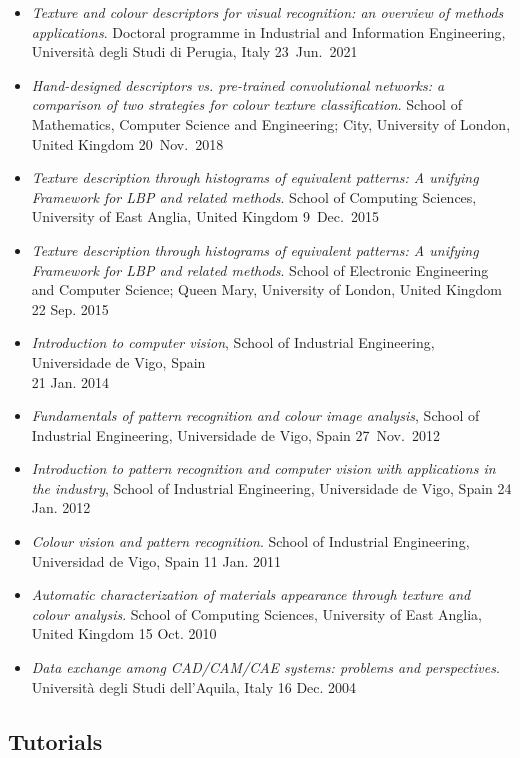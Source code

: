 \documentclass[11pt]{article}
\begin{document}
\begin{itemize}
	\item \emph{Texture and colour descriptors for visual recognition: an overview of methods applications}. Doctoral programme in Industrial and Information Engineering, Università degli Studi di Perugia, Italy \mbox{} \hfill 23~Jun.~2021
	\item \emph{Hand-designed descriptors vs. pre-trained convolutional networks: a comparison of two strategies for colour texture classification}. School of Mathematics, Computer Science and Engineering; City, University of London, United Kingdom \hfill 20~Nov.~2018
	\item \emph{Texture description through histograms of equivalent patterns: A unifying Framework for LBP and related methods}. School of Computing Sciences, University of East Anglia, United Kingdom \mbox{} \hfill 9~Dec.~2015
	\item \emph{Texture description through histograms of equivalent patterns: A unifying Framework for LBP and related methods}. School of Electronic Engineering and Computer Science; Queen Mary, University of London, United Kingdom \hfill 22 Sep. 2015
	\item \emph{Introduction to computer vision}, School of Industrial Engineering, Universidade de Vigo, Spain \\ \mbox{} \hfill 21 Jan. 2014
	\item \emph{Fundamentals of pattern recognition and colour image analysis}, School of Industrial Engineering, Universidade de Vigo, Spain \hfill 27~Nov.~2012
	\item \emph{Introduction to pattern recognition and computer vision with applications in the industry}, School of Industrial Engineering, Universidade de Vigo, Spain \hfill 24 Jan. 2012
	\item \emph{Colour vision and pattern recognition}. School of Industrial Engineering, Universidad de Vigo, Spain \hfill 11 Jan. 2011
	\item \emph{Automatic characterization of materials appearance through texture and colour analysis}. School of Computing Sciences, University of East Anglia, United Kingdom \hfill 15 Oct. 2010
	\item \emph{Data exchange among CAD/CAM/CAE systems: problems and perspectives}. Università degli Studi dell’Aquila, Italy \hfill 16 Dec. 2004
\end{itemize} 

\subsection*{Tutorials}
\end{document}
